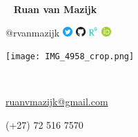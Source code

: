 \begin{multicols}{3}
  \
  \vfill
  \raggedleft
    {\Large \textbf{Ruan van Mazijk}} \par
    {\large @rvanmazijk}
    \href{https://twitter.com/rvanmazijk}
         {\includegraphics[width=1em]{logos/Twitter.png}}
    \href{https://github.com/rvanmazijk}
         {\includegraphics[width=1em]{logos/GitHub.png}}
    \href{https://www.researchgate.net/profile/Ruan-Van-Mazijk}
         {\includegraphics[width=1em]{logos/ResearchGate-white_crop.jpg}}
    \href{https://orcid.org/0000-0003-2659-6909}
         {\includegraphics[width=1em]{logos/ORCID.png}}
  \
  
  \columnbreak
  \begin{center}
    \texttt{[image: IMG\_4958\_crop.png]}
  \end{center}
  \columnbreak
  \par
  
  \
  \vfill
  \raggedright
    {\large \href{mailto:ruanvmazijk@gmail.com}{ruanvmazijk@gmail.com}} \par
    (+27) 72 516 7570
  \
\end{multicols}

